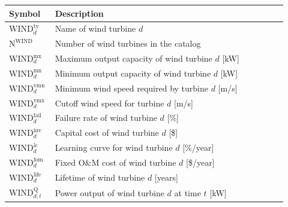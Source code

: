 \documentclass[11pt]{article}
\begin{document}
\begin{center}
\centering
\begin{tabular}{p{0.12\linewidth}p{0.8\linewidth}}
\hline
\textbf{Symbol} & \textbf{Description} \\
\hline
\(\text{WIND}^\text{ty}_d\) & Name of wind turbine \(d\) \\
\(\text{N}^\text{WIND}\) & Number of wind turbines in the catalog \\
\(\text{WIND}^\text{mx}_d\) & Maximum output capacity of wind turbine \(d\) [kW] \\
\(\text{WIND}^\text{mn}_d\) & Minimum output capacity of wind turbine \(d\) [kW] \\
\(\text{WIND}^\text{vmn}_d\) & Minimum wind speed required by turbine \(d\) [m/s] \\
\(\text{WIND}^\text{vmx}_d\) & Cutoff wind speed for turbine \(d\) [m/s] \\
\(\text{WIND}^\text{fail}_d\) & Failure rate of wind turbine \(d\) [\%] \\
\(\text{WIND}^\text{inv}_d\) & Capital cost of wind turbine \(d\) [\$] \\
\(\text{WIND}^\text{lc}_d\) & Learning curve for wind turbine \(d\) [\%/year] \\
\(\text{WIND}^\text{fom}_d\) & Fixed O\&M cost of wind turbine \(d\) [\$/year] \\
\(\text{WIND}^\text{life}_d\) & Lifetime of wind turbine \(d\) [years] \\
\(\text{WIND}^\text{Q}_{d,t}\) & Power output of wind turbine \(d\) at time \(t\) [kW] \\
\hline
\end{tabular}
\captionsetup{type=table}
\label{tab:wind_parameters}
\end{center}
\end{document}
